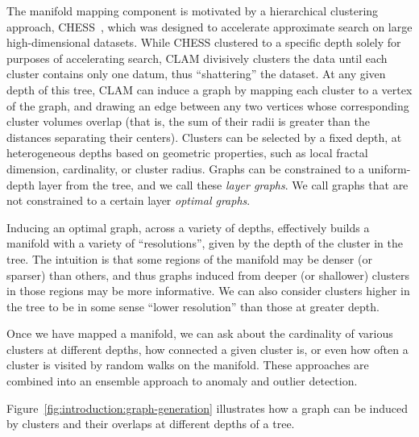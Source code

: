 The manifold mapping component is motivated by a hierarchical clustering approach, CHESS~\cite{ishaq2019clustered}, which was designed to accelerate approximate search on large high-dimensional datasets.
While CHESS clustered to a specific depth solely for purposes of accelerating search, CLAM
divisively clusters the data until each cluster contains only one datum, thus ``shattering'' the dataset.
At any given depth of this tree, CLAM can induce a graph by mapping each cluster to a vertex of the graph, and drawing an edge between any two vertices whose corresponding cluster volumes overlap (that is, the sum of their radii is greater than the distances separating their centers).
Clusters can be selected by a fixed depth, at heterogeneous depths based on geometric properties, such as local fractal dimension, cardinality, or cluster radius.
Graphs can be constrained to a uniform-depth layer from the tree, and we call these \textit{layer graphs}.
We call graphs that are not constrained to a certain layer \textit{optimal graphs}.

Inducing an optimal graph, across a variety of depths, effectively builds a manifold with a variety of ``resolutions'', given by the depth of the cluster in the tree. The intuition is that some regions of the manifold may be denser (or sparser) than others, and thus graphs induced from deeper (or shallower) clusters in those regions may be more informative.
We can also consider clusters higher in the tree to be in some sense ``lower resolution'' than those at greater depth.

Once we have mapped a manifold, we can ask about the cardinality of various clusters at different depths, how connected a given cluster is, or even how often a cluster is visited by random walks on the manifold.
These approaches are combined into an ensemble approach to anomaly and outlier detection.

Figure~\ref{fig:introduction:graph-generation} illustrates how a graph can be induced by clusters and their overlaps at different depths of a tree.


